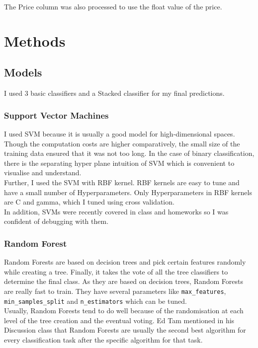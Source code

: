\documentclass[12pt]{article}
\theoremstyle{definition}
\begin{document}
The Price column was also processed to use the float value of the price. 





\section{Methods}
\subsection{Models}
I used 3 basic classifiers and a Stacked classifier for my final predictions. 
\subsubsection{Support Vector Machines}
I used SVM because it is usually a good model for high-dimensional spaces. Though the computation costs are higher comparatively, the small size of the training data ensured that it was not too long. In the case of binary classification, there is the separating hyper plane intuition of SVM which is convenient to visualise and understand.\\

Further, I used the SVM with RBF kernel. RBF kernels are easy to tune and have a small number of Hyperparameters. Only Hyperparameters in RBF kernels are C and gamma, which I tuned using cross validation. \\

In addition, SVMs were recently covered in class and homeworks so I was confident of debugging with them.\\

\subsubsection{Random Forest}
Random Forests are based on decision trees and pick certain features randomly while creating a tree. Finally, it takes the vote of all the tree classifiers to determine the final class. As they are based on decision trees, Random Forests are really fast to train. They have several parameters like \texttt{max\_features}, \texttt{min\_samples\_split} and \texttt{n\_estimators} which can be tuned.\\

Usually, Random Forests tend to do well because of the randomisation at each level of the tree creation and the eventual voting. Ed Tam mentioned in his Discussion class that Random Forests are usually the second best algorithm for every classification task after the specific algorithm for that task.
\end{document}
